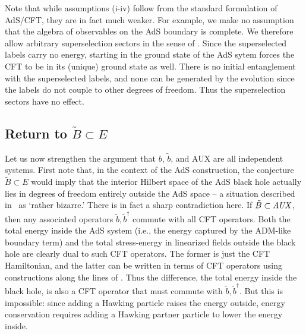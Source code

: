 \documentclass[12pt]{article}
\begin{document}
{Note that while assumptions (i-iv) follow from the standard formulation of AdS/CFT, they are in fact much weaker.  For example, we make no assumption that the algebra of observables on the AdS boundary is complete.  We therefore allow arbitrary superselection sectors in the sense of \cite{Marolf:2008tx,Marolf:2012xe}.  Since the superselected labels carry no energy, starting in the ground state of the AdS sytem forces the CFT to be in its (unique) ground state as well.  {There is no initial entanglement with the superselected labels, and none can be generated by the evolution since the labels do not couple to other degrees of freedom.} Thus the superselection sectors have no effect.



\label{comp}
\subsection{Return to $\tilde B \subset E$}


{Let us now strengthen the argument that $b$, $\tilde b$, and AUX are all independent systems. First note that, in the context of the AdS construction, the conjecture $\tilde B \subset E$ would imply that the interior Hilbert space of the AdS black hole actually lies in degrees of freedom entirely outside the AdS space -- a situation described in~\cite{Avery:2013exa} as `rather bizarre.'  There is in fact a sharp contradiction here.  If $\tilde B \subset \it AUX$, then any associated operators $\tilde b, \tilde b^\dagger$ commute with all CFT operators.  Both the total energy inside the AdS system (i.e., the energy captured by the ADM-like boundary term) and the total stress-energy in linearized fields outside the black hole are clearly dual to such CFT operators.  The former is just the CFT Hamiltonian, and the latter can be written in terms of CFT operators using constructions along the lines of \cite{Kabat:2011rz,Heemskerk:2012mn}.  Thus the difference, the total energy inside the black hole, is also a CFT operator that must commute with $\tilde b, \tilde b^\dagger$.  But this is impossible:  since adding a Hawking particle raises the energy outside, energy conservation requires adding a Hawking partner particle to lower the energy inside.}


}
\end{document}
